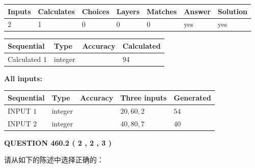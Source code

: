 \documentclass{ctexart}
\begin{document}
 
\noindent{}
 
 

 
   
   
   
   
\noindent\begin{tabular}{|l|l|l|l|l|l|l|}
 \hline
Inputs & Calculates & Choices & Layers & Matches & Answer & Solution \\ \hline
 2  & 
 1  & 
 0
  & 
 0  & 
 0  & 
  yes & 
  yes 
  \\ \hline
 \end{tabular}
   
   
   
   
\noindent{}
   
   
  
  
\noindent\begin{tabular}{|l|l|l|l|}
\hline
 Sequential & Type & Accuracy & Calculated \\ 
\hline
 
 
  Calculated $  1 $ & integer &  & 
  $ 94 $ 
 \\  \hline  
 \end{tabular}
   
   
   
   
\noindent\vspace{0.1in}\hspace{-0.08in} {\textbf{\Large{All inputs: }}}
   
   
  
  
\noindent\begin{tabular}{|l|l|l|l|l|}
\hline
 Sequential & Type & Accuracy & Three inputs & Generated \\ 
\hline
 
 
  INPUT $  1 $ & integer &  & $
 20
 , 
 60
 , 
 2
 $ & $ 54 $ 
 \\  \hline  
 
 
  INPUT $  2 $ & integer &  & $
 40
 , 
 80
 , 
 7
 $ & $ 40 $ 
 \\  \hline  
 \end{tabular}
   
   
  
\vspace{0.2in}
  
{\textbf{\Large{QUESTION
460.2 
 ( 2 , 2 , 3 )
}}}
  
  
请从如下的陈述中选择正确的：
 
\end{document}
